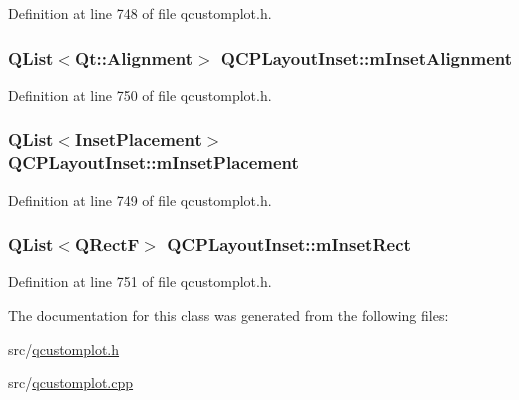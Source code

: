 Definition at line 748 of file qcustomplot.\-h.

\hypertarget{class_q_c_p_layout_inset_a55e9b84c310136ff985a6544184ab64a}{
\subsubsection[{m\-Inset\-Alignment}]{\setlength{\rightskip}{0pt plus 5cm}Q\-List$<$Qt\-::\-Alignment$>$ Q\-C\-P\-Layout\-Inset\-::m\-Inset\-Alignment\hspace{0.3cm}{\ttfamily [protected]}}}\label{class_q_c_p_layout_inset_a55e9b84c310136ff985a6544184ab64a}


Definition at line 750 of file qcustomplot.\-h.

\hypertarget{class_q_c_p_layout_inset_a57a0a4e445cc78eada29765ecf092abe}{
\subsubsection[{m\-Inset\-Placement}]{\setlength{\rightskip}{0pt plus 5cm}Q\-List$<${\bf Inset\-Placement}$>$ Q\-C\-P\-Layout\-Inset\-::m\-Inset\-Placement\hspace{0.3cm}{\ttfamily [protected]}}}\label{class_q_c_p_layout_inset_a57a0a4e445cc78eada29765ecf092abe}


Definition at line 749 of file qcustomplot.\-h.

\hypertarget{class_q_c_p_layout_inset_aaa8f6b5029458f3d97a65239524a2b33}{
\subsubsection[{m\-Inset\-Rect}]{\setlength{\rightskip}{0pt plus 5cm}Q\-List$<$Q\-Rect\-F$>$ Q\-C\-P\-Layout\-Inset\-::m\-Inset\-Rect\hspace{0.3cm}{\ttfamily [protected]}}}\label{class_q_c_p_layout_inset_aaa8f6b5029458f3d97a65239524a2b33}


Definition at line 751 of file qcustomplot.\-h.



The documentation for this class was generated from the following files\-:\begin{DoxyCompactItemize}
\item 
src/\hyperlink{qcustomplot_8h}{qcustomplot.\-h}\item 
src/\hyperlink{qcustomplot_8cpp}{qcustomplot.\-cpp}\end{DoxyCompactItemize}
